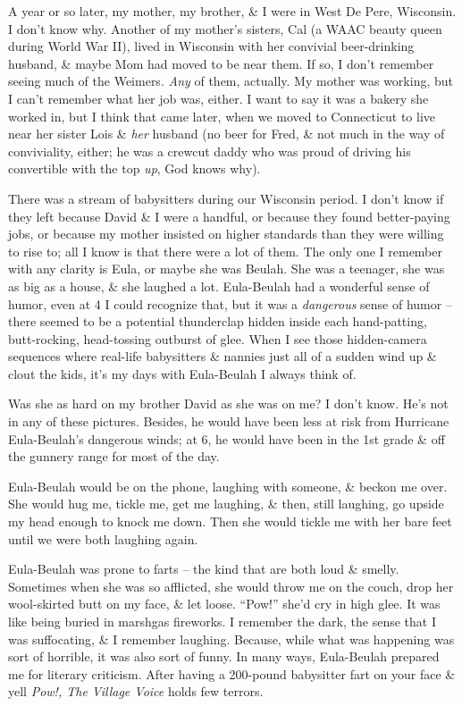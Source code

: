 \documentclass{article}
\numberwithin{equation}{section}
\begin{document}
 A year or so later, my mother, my brother, \& I were in West De Pere, Wisconsin. I don't know why. Another of my mother's sisters, Cal (a WAAC beauty queen during World War II), lived in Wisconsin with her convivial beer-drinking husband, \& maybe Mom had moved to be near them. If so, I don't remember seeing much of the Weimers. \textit{Any} of them, actually. My mother was working, but I can't remember what her job was, either. I want to say it was a bakery she worked in, but I think that came later, when we moved to Connecticut to live near her sister Lois \& \textit{her} husband (no beer for Fred, \& not much in the way of conviviality, either; he was a crewcut daddy who was proud of driving his convertible with the top \textit{up}, God knows why).

There was a stream of babysitters during our Wisconsin period. I don't know if they left because David \& I were a handful, or because they found better-paying jobs, or because my mother insisted on higher standards than they were willing to rise to; all I know is that there were a lot of them. The only one I remember with any clarity is Eula, or maybe she was Beulah. She was a teenager, she was as big as a house, \& she laughed a lot. Eula-Beulah had a wonderful sense of humor, even at 4 I could recognize that, but it was a \textit{dangerous} sense of humor -- there seemed to be a potential thunderclap hidden inside each hand-patting, butt-rocking, head-tossing outburst of glee. When I see those hidden-camera sequences where real-life babysitters \& nannies just all of a sudden wind up \& clout the kids, it's my days with Eula-Beulah I always think of.

Was she as hard on my brother David as she was on me? I don't know. He's not in any of these pictures. Besides, he would have been less at risk from Hurricane Eula-Beulah's dangerous winds; at 6, he would have been in the 1st grade \& off the gunnery range for most of the day.

Eula-Beulah would be on the phone, laughing with someone, \& beckon me over. She would hug me, tickle me, get me laughing, \& then, still laughing, go upside my head enough to knock me down. Then she would tickle me with her bare feet until we were both laughing again.

Eula-Beulah was prone to farts -- the kind that are both loud \& smelly. Sometimes when she was so afflicted, she would throw me on the couch, drop her wool-skirted butt on my face, \& let loose. ``Pow!'' she'd cry in high glee. It was like being buried in marshgas fireworks. I remember the dark, the sense that I was suffocating, \& I remember laughing. Because, while what was happening was sort of horrible, it was also sort of funny. In many ways, Eula-Beulah prepared me for literary criticism. After having a 200-pound babysitter fart on your face \& yell \textit{Pow!, The Village Voice} holds few terrors.
\end{document}
